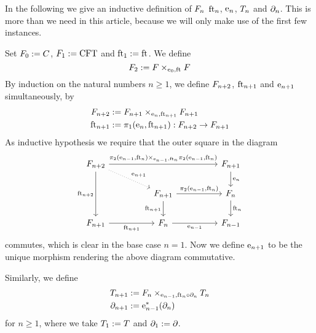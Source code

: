 In the following we give an inductive definition of $\stesysf_n$ $\eft[n]$, $\eext{n}$,
$\stesyst_n$ and $\ebd[n]$. This is more than we need in this article, because
we will only make use of the first few instances.
\begin{defn}
Set $\stesysf_0:=\stesysc$, $\stesysf_1:=\stesys$ and $\eft[1]:=\eft$. We define
\begin{equation*}
\stesysf_{2} 
  := \pullback{\stesysf}{\stesysf}{\ectxext}{\eft}
\end{equation*}
By induction on the natural numbers $n\geq 1$, we define $\stesysf_{n+2}$, $\eft[n+1]$ and
$\eext{n+1}$ simultaneously, by
\begin{align*}
\stesysf_{n+2} 
  & := \pullback{\stesysf_{n+1}}{\stesysf_{n+1}}{\eext{n}}{\eft[n+1]}
  \\
\eft[n+1] 
  & := \pullbackpr{1}{\eext{n}}{\eft[n+1]} : \stesysf_{n+2}\to\stesysf_{n+1}
\end{align*}
As inductive hypothesis we require that the outer square in the diagram
\begin{equation*}
\begin{tikzcd}[column sep=huge]
\stesysf_{n+2}
  \ar[dotted]{dr}{\eext{n+1}}
  \ar{rr}{\pullback{\pullbackpr{2}{\eext{n-1}}{\eft[n]}}{\pullbackpr{2}{\eext{n-1}}{\eft[n]}}{\eext{n-1}}{\eft[n]}}
  \ar{dd}[swap]{\eft[n+2]}
  & 
  &
\stesysf_{n+1}
  \ar{d}{\eext{n}}
  \\
  &
\stesysf_{n+1}
  \ar{d}[swap]{\eft[n+1]}
  \ar{r}{\pullbackpr{2}{\eext{n-1}}{\eft[n]}}
  &
\stesysf_{n}
  \ar{d}{\eft[n]}
  \\
\stesysf_{n+1}
  \ar{r}[swap]{\eft[n+1]}
  &
\stesysf_{n}
  \ar{r}[swap]{\eext{n-1}}
  &
\stesysf_{n-1}
\end{tikzcd}
\end{equation*}
commutes, which is clear in the base case $n=1$. Now we define $\eext{n+1}$ to be the
unique morphism rendering the above diagram commutative.

Similarly, we define
\begin{align*}
\stesyst_{n+1} 
  & := \pullback{\stesysf_n}{\stesyst_n}{\eext{n-1}}{\eft[n]\circ\ebd[n]}
  \\
\ebd[n+1]
  & := \eext{n-1}^\ast(\ebd[n])
\end{align*}
for $n\geq 1$, where we take $\stesyst_1:=\stesyst$ and $\ebd[1]:=\ebd$.
\end{defn}

